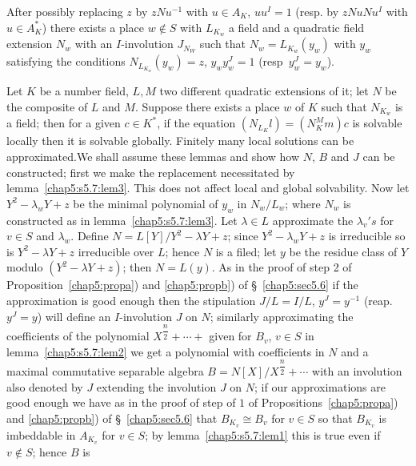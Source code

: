 \begin{lem}\label{chap5:s5.7:lem3} %
After possibly replacing  $z$ by  $zNu^{-1}$ with $u \in A_K$, $uu^I =
1$ (resp. by $zNuNu^I$ with $u \in A^*_K$) there exists a place $w
\notin S$ with $L_{K_{w}}$ a field and  a quadratic field extension
$N_w$ with an $I$-involution $J_{N_{W}}$ such that $N_w =
L_{K_w}(y_w)$ with $y_w$ satisfying the conditions $N_{L_{K_w}} (y_w)
= z$, $y_w y^J_w = 1$ (resp~$y^J_w = y_w$). 
\end{lem}

\begin{lem}\label{chap5:s5.7:lem4}%
Let $K$ be a number field, $L,M$ two different quadratic extensions of
it; let $N$ be the  composite of $L$ and $M$. Suppose there exists a
place $w$ of $K$ such that $N_{K_{w}}$ is a field; then for a given
$c \in K^*$, if the equation $(N_{L_{K}} l)  = (N^M_K m)c$ is solvable
locally then it is solvable  globally. Finitely many local solutions
can be approximated.\pageoriginale We shall assume these lemmas and
show how $N$, $B$ 
and $J$ can be constructed; first we make the replacement necessitated
by lemma~\ref{chap5:s5.7:lem3}. This does not affect local and global solvability. Now
let $Y^2 - \lambda_w Y+z$ be the minimal polynomial of $y_w$ in $N_w /
L_w$; where $N_w$ is constructed  as in lemma~\ref{chap5:s5.7:lem3}. Let $\lambda \in L$
approximate the $\lambda_v's$ for $v \in S$ and $\lambda_w$. Define
$N=L[Y]/Y^2 - \lambda Y+z$; since $Y^2 - \lambda_w Y+z$ is irreducible
so is $Y^2- \lambda Y+z$ irreducible over $L$; hence $N$ is a filed;
let $y$ be the residue class of $Y$ modulo $(Y^2 - \lambda Y+z)$; then
$N = L(y)$. As in the proof of step 2 of Proposition~\ref{chap5:propa}) and \ref{chap5:propb})
of \S~\ref{chap5:sec5.6} if the approximation is good enough then
the stipulation 
$J/L= I/L$, $y^J = y^{-1}$ (reap. $y^J=y$) will define an $I$-involution
$J$ on $N$; similarly approximating the coefficients of the polynomial
$X^{\dfrac{n}{2}}+ \cdots +$ given for $B_v$, $v \in S$ in lemma~\ref{chap5:s5.7:lem2} we
get a polynomial with coefficients in $N$ and a maximal commutative
separable algebra $B = N [X]/ X^{\dfrac{n}{2}} + \cdots$ with an
involution also denoted by $J$ extending the involution $J$ on $N$; if
our approximations are good enough we have as in the proof of step of
$1$ of Propositions~\ref{chap5:propa}) and \ref{chap5:propb}) of \S~\ref{chap5:sec5.6} that
$B_{K_v} \cong B_v$ 
for $v \in S$ so that $B_{K_v}$ is imbeddable in $A_{K_v}$ for $v \in
S$; by lemma~\ref{chap5:s5.7:lem1} this is true even if $v \notin S$; hence $B$ is

\end{lem}

